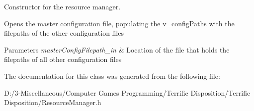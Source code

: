 Constructor for the resource manager. 

Opens the master configuration file, populating the v\+\_\+config\+Paths with the filepaths of the other configuration files
\begin{DoxyParams}{Parameters}
{\em master\+Config\+Filepath\+\_\+in} & Location of the file that holds the filepaths of all other configuration files \\
\hline
\end{DoxyParams}


The documentation for this class was generated from the following file\+:\begin{DoxyCompactItemize}
\item 
D\+:/3-\/\+Miscellaneous/\+Computer Games Programming/\+Terrific Disposition/\+Terrific Disposition/Resource\+Manager.\+h\end{DoxyCompactItemize}
